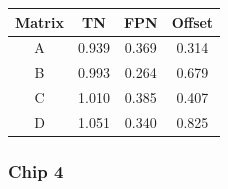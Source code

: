 \documentclass[a4papper, 10pt]{article}
\begin{document}
\begin{itemize}
            \begin{center}
              \begin{tabular}{ c c c c }
                \hline %
         \rowcolor{light-gray}         Matrix  &  TN   &  FPN  &  Offset  \tabularnewline
                \hline %
                \hline %
                    A     & 0.939 & 0.369 & 0.314    \tabularnewline
                \hline %
                    B     & 0.993 & 0.264 & 0.679   \tabularnewline
                \hline %
                    C     & 1.010 & 0.385 & 0.407   \tabularnewline
                \hline %
                    D     & 1.051 & 0.340 & 0.825    \tabularnewline
                \hline %
              \end{tabular}
            \end{center}
    \end{itemize}

   \subsubsection{Chip 4}
  
\end{document}
